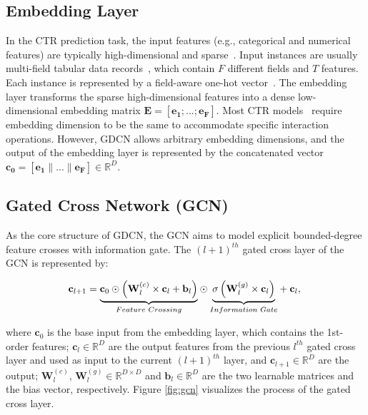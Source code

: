 \documentclass[sigconf]{acmart}
\begin{document}
\subsection{Embedding Layer}
In the CTR prediction task, the input features (e.g., categorical and numerical features) are typically high-dimensional and sparse~\cite{meng2021autopi, song2019autoint, zhao2021non}. Input instances are usually multi-field tabular
data records~\cite {wang2023cl4ctr, guo2022miss, zhao2021non}, which contain $F$ different fields and $T$ features. Each instance is represented by a field-aware one-hot vector~\cite{song2019autoint, wang2022enhancing, meng2021autopi}. The embedding layer transforms the sparse high-dimensional features into a dense low-dimensional embedding matrix $\mathbf{E}=[\mathbf{e_1};...;\mathbf{e_F}]$. Most CTR models~\cite{naumov2019deep, qu2018product, huang2019fibinet, song2019autoint, meng2021autopi, guo2017deepfm} require embedding dimension to be the same to accommodate specific interaction operations. However, GDCN allows arbitrary embedding dimensions, and the output of the embedding layer is represented by the concatenated vector $\mathbf{c_0}=[\mathbf{e_1}\parallel ... \parallel \mathbf{e_F}] \in \mathbb{R} ^ {D}$.


\subsection{Gated Cross Network (GCN)}
As the core structure of GDCN, the GCN aims to model explicit bounded-degree feature crosses with information gate. The $(l+1)^{th}$ gated cross layer of the GCN is represented by:
\begin{small}
\begin{equation}
\label{equ:gcn}
\mathbf{c}_{l+1}=\underset{Feature\,\,Crossing}{\underbrace{\mathbf{c}_0\odot \left( \mathbf{W}_{l}^{\left( c \right)} \times \mathbf{c}_l+\mathbf{b}_l \right) }}\odot \underset{Information\,\,Gate}{\underbrace{\sigma \left( \mathbf{W}_{l}^{\left( g \right)} \times \mathbf{c}_l \right) }}+\mathbf{c}_l,\\
\end{equation}
\end{small}
where $\mathbf{c}_0$ is the base input from the embedding layer, which contains the 1st-order features; $\mathbf{c}_{l} \in \mathbb{R}^D $ are the output features from the previous $l^{th}$ gated cross layer and used as input to the current $(l+1)^{th}$ layer, and $\mathbf{c}_{l+1} \in \mathbb{R}^D $ are the output; $\mathbf{W}_{l}^{(c)}$, $\mathbf{W}_{l}^{(g)} \in \mathbb{R}^{D\times D}$ and $\mathbf{b}_{l} \in \mathbb{R}^{D}$ are the two learnable matrices and the bias vector, respectively. Figure \ref{fig:gcn} visualizes the process of the gated cross layer.
\end{document}
